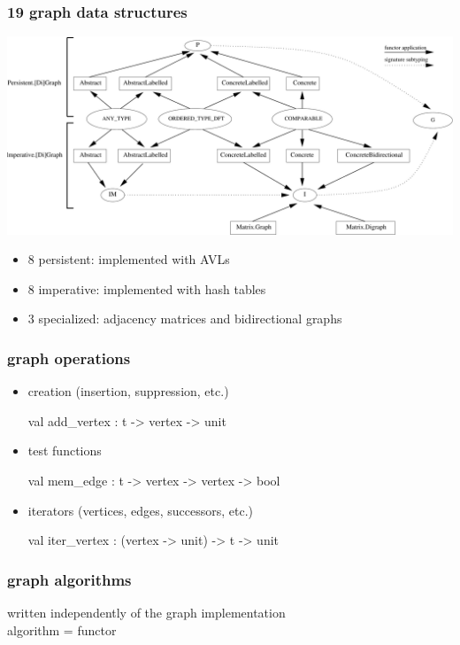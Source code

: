\documentclass{beamer}
\newcommand{\bleu}[1]{{\color{blue}#1}}
\let\emph\alert
\begin{document}
\begin{frame}\frametitle{19 graph data structures}
  \includegraphics[width=\textwidth]{tfp07/interface.pdf}
\begin{itemize}
\item 8 \bleu{persistent}: implemented with AVLs
\item 8 \bleu{imperative}: implemented with hash tables
\item 3 \bleu{specialized}: adjacency matrices and bidirectional graphs
\end{itemize}
\end{frame}

\begin{frame}[fragile]
  \frametitle{graph operations}
  \begin{itemize}
  \item \emph{creation} (insertion, suppression, etc.)
    \begin{ocaml}
      val add_vertex : t -> vertex -> unit
    \end{ocaml}
  \item \emph{test functions}
    \begin{ocaml}
      val mem_edge : t -> vertex -> vertex -> bool
    \end{ocaml}
  \item \emph{iterators} (vertices, edges, successors, etc.)
    \begin{ocaml}
      val iter_vertex : (vertex -> unit) -> t -> unit
    \end{ocaml}
  \end{itemize}
\end{frame}

\begin{frame}
  \frametitle{graph algorithms}

  \begin{center}
    written independently of the graph implementation\\[1.2em]
    \emph{algorithm = functor}\\[1em]
  \end{center}
\end{frame}
\end{document}
